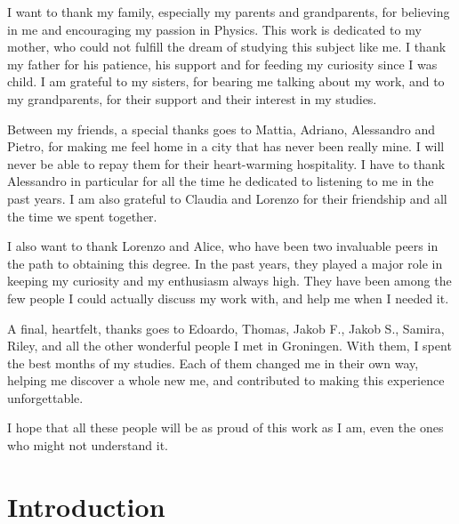 I want to thank my family, especially my parents and grandparents, for believing in me and encouraging my passion in Physics. This work is dedicated to my mother, who could not fulfill the dream of studying this subject like me. I thank my father for his patience, his support and for feeding my curiosity since I was child. I am grateful to my sisters, for bearing me talking about my work, and to my grandparents, for their support and their interest in my studies.

Between my friends, a special thanks goes to Mattia, Adriano, Alessandro and Pietro, for making me feel home in a city that has never been really mine. I will never be able to repay them for their heart-warming hospitality. I have to thank Alessandro in particular for all the time he dedicated to listening to me in the past years. I am also grateful to Claudia and Lorenzo for their friendship and all the time we spent together.

I also want to thank Lorenzo and Alice, who have been two invaluable peers in the path to obtaining this degree. In the past years, they played a major role in keeping my curiosity and my enthusiasm always high. They have been among the few people I could actually discuss my work with, and help me when I needed it.

A final, heartfelt, thanks goes to Edoardo, Thomas, Jakob F., Jakob S., Samira, Riley, and all the other wonderful people I met in Groningen. With them, I spent the best months of my studies. Each of them changed me in their own way, helping me discover a whole new me, and contributed to making this experience unforgettable.

I hope that all these people will be as proud of this work as I am, even the ones who might not understand it.

\chapter{Introduction}
